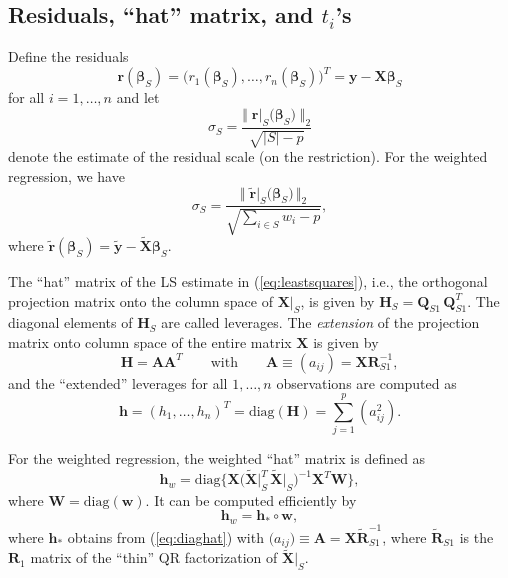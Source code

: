 \documentclass[a4paper,oneside,11pt,DIV=12]{scrartcl}
\begin{document}
\subsection{Residuals, ``hat'' matrix, and $t_i$'s}
Define the residuals
\begin{equation}\label{eq:residuals}
	\bm r(\bm \beta_S) = \big( r_1(\bm \beta_S), \ldots, r_n(\bm \beta_S) \big)^T = \bm y - \bm X \bm \beta_S
\end{equation}
\noindent for all $i = 1, \ldots, n$ and let 
\begin{equation}\label{eq:sigma}
	\sigma_S = \frac{ \big\Vert \; \bm r \vert_S \big(\bm \beta_S) \; \big\Vert_2}{\sqrt{\vert S \vert - p}} 
\end{equation}
\noindent denote the estimate of the residual scale (on the restriction). For the weighted regression, we have  
\begin{equation}
	\sigma_S = \frac{ \big\Vert \; \widetilde{\bm r} \vert_S \big(\bm \beta_S) \, \big \Vert_2}{\sqrt{ \sum_{i \in S} w_i - p}}, 
\end{equation}
\noindent where $\widetilde{\bm r}(\bm \beta_S) = \widetilde{\bm y} - \widetilde{\bm X} \bm \beta_S$.

The ``hat'' matrix of the LS estimate in (\ref{eq:leastsquares}), i.e., the orthogonal projection matrix onto the column space of $\bm X \vert_S$, is given by $\bm H_S = \bm Q_{S1} \, \bm Q_{S1}^T$. The diagonal elements of $\bm H_S$ are called leverages. The \textit{extension} of the projection matrix onto column space of the entire matrix $\bm X$ is given by 
\begin{equation*}
	\bm H = \bm A \bm A^T \qquad \text{with} \qquad \bm A \equiv (a_{ij})= \bm X \bm R_{S1}^{-1}, 
\end{equation*}
\noindent and the ``extended'' leverages for all $1, \ldots, n$ observations are computed as 
\begin{equation}\label{eq:diaghat}
	\bm h = (h_1, \ldots, h_n)^T = \mathrm{diag}(\bm H) = \sum_{j = 1}^p (a_{ij}^2).
\end{equation}

\noindent For the weighted regression, the weighted ``hat'' matrix is defined as \citep{li_valliant_2009}  
\begin{equation}
	\bm h_w = \mathrm{diag}\Big\{\bm X\big( \widetilde{\bm X}\vert_S^T \, \widetilde{\bm X}\vert_S \big)^{-1} \bm X^T \bm W\Big\},
\end{equation}
\noindent where $\bm W = \mathrm{diag}(\bm w)$. It can be computed efficiently by 
\begin{equation}
	\bm h_w = \bm h_* \circ \bm w,
\end{equation}
\noindent where $\bm h_*$ obtains from  (\ref{eq:diaghat}) with $\bm (a_{ij}) \equiv \bm A = \bm X \widetilde{\bm R}_{S1}^{-1}$, where $\widetilde{\bm R}_{S1}$ is the $\bm R_1$ matrix of the ``thin'' QR factorization of $\widetilde{\bm X}\vert_S$.
\end{document}
